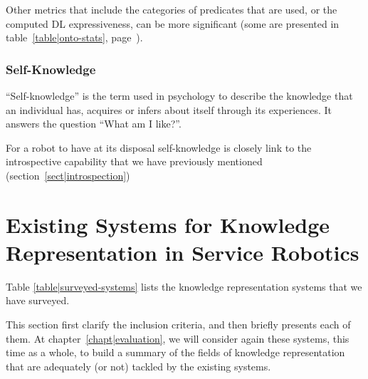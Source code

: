 Other metrics that include the categories of predicates that are used, or the
computed DL expressiveness, can be more significant (some are presented in
table~\ref{table|onto-stats}, page~\pageref{table|onot-stats}).

\subsubsection{Self-Knowledge}

``Self-knowledge'' is the term used in psychology to describe the knowledge
that an individual has, acquires or infers about itself through its
experiences. It answers the question ``What am I like?''.

For a robot to have at its disposal self-knowledge is closely link to the
introspective capability that we have previously mentioned
(section~\ref{sect|introspection})


\section{Existing Systems for Knowledge Representation in Service Robotics}
\label{sect|surveyed-systems}


Table \ref{table|surveyed-systems} lists the knowledge representation
systems that we have surveyed.

This section first clarify the inclusion criteria, and then briefly presents
each of them. At chapter~\ref{chapt|evaluation}, we will consider again these
systems, this time as a whole, to build a summary of the fields of knowledge
representation that are adequately (or not) tackled by the existing systems.

